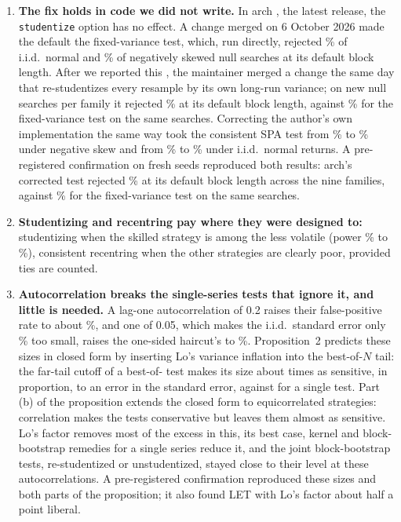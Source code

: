 \begin{enumerate}
  \item \textbf{The fix holds in code we did not write.} In arch  \citep{sheppard2025arch}, the latest release, the \texttt{studentize} option has no effect. A change merged on 6 October 2026 \citep{arch871} made the default the fixed-variance test, which, run directly, rejected \% of i.i.d.\ normal and \% of negatively skewed null searches at its default block length. After we reported this \citep{arch879}, the maintainer merged a change the same day \citep{arch882} that re-studentizes every resample by its own long-run variance; on  new null searches per family it rejected \% at its default block length, against \% for the fixed-variance test on the same searches. Correcting the author's own implementation the same way took the consistent SPA test from \% to \% under negative skew and from \% to \% under i.i.d.\ normal returns. A pre-registered confirmation on fresh seeds reproduced both results: arch's corrected test rejected \% at its default block length across the nine families, against \% for the fixed-variance test on the same searches.
  \item \textbf{Studentizing and recentring pay where they were designed to:} studentizing when the skilled strategy is among the less volatile (power \% to \%), consistent recentring when the other strategies are clearly poor, provided ties are counted.
  \item \textbf{Autocorrelation breaks the single-series tests that ignore it, and little is needed.} A lag-one autocorrelation of 0.2 raises their false-positive rate to about \%, and one of 0.05, which makes the i.i.d.\ standard error only \% too small, raises the one-sided haircut's to \%. Proposition~2 predicts these sizes in closed form by inserting Lo's variance inflation into the best-of-$N$ tail: the far-tail cutoff of a best-of- test makes its size about  times as sensitive, in proportion, to an error in the standard error, against  for a single test. Part (b) of the proposition extends the closed form to equicorrelated strategies: correlation makes the tests conservative but leaves them almost as sensitive. Lo's factor removes most of the excess in this, its best case, kernel and block-bootstrap remedies for a single series reduce it, and the joint block-bootstrap tests, re-studentized or unstudentized, stayed close to their level at these autocorrelations. A pre-registered confirmation reproduced these sizes and both parts of the proposition; it also found LET with Lo's factor about half a point liberal.

\end{enumerate}
